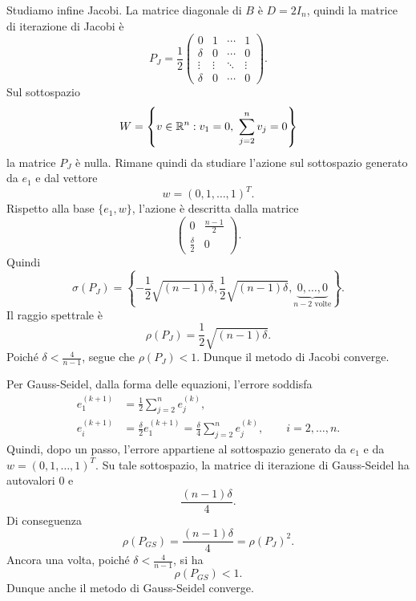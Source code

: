 \documentclass[a4paper]{article}
\begin{document}
\begin{snippetsolution}{}
    Studiamo infine Jacobi. La matrice diagonale di \(B\) è \(D=2I_n\), quindi la
    matrice di iterazione di Jacobi è
    \[
        P_J=
        \frac{1}{2}
        \begin{pmatrix}
            0 & 1 & \cdots & 1 \\
            \delta & 0 & \cdots & 0 \\
            \vdots & \vdots & \ddots & \vdots \\
            \delta & 0 & \cdots & 0
        \end{pmatrix}.
    \]
    Sul sottospazio
    \[
        W=
        \left\{
            v\in\mathbb{R}^n:
            v_1=0,\
            \sum_{j=2}^{n}v_j=0
        \right\}
    \]
    la matrice \(P_J\) è nulla. Rimane quindi da studiare l'azione sul sottospazio
    generato da \(e_1\) e dal vettore
    \[
        w=(0,1,\ldots,1)^T.
    \]
    Rispetto alla base \(\{e_1,w\}\), l'azione è descritta dalla matrice
    \[
        \begin{pmatrix}
            0 & \frac{n-1}{2} \\
            \frac{\delta}{2} & 0
        \end{pmatrix}.
    \]
    Quindi
    \[
        \sigma(P_J)=
        \left\{
            -\frac{1}{2}\sqrt{(n-1)\delta},
            \frac{1}{2}\sqrt{(n-1)\delta},
            \underbrace{0,\ldots,0}_{n-2\text{ volte}}
        \right\}.
    \]
    Il raggio spettrale è
    \[
        \rho(P_J)
        =
        \frac{1}{2}\sqrt{(n-1)\delta}.
    \]
    Poiché \(\delta<\frac{4}{n-1}\), segue che \(\rho(P_J)<1\).
    Dunque il metodo di Jacobi converge.

    Per Gauss-Seidel, dalla forma delle equazioni, l'errore soddisfa
    \begin{align*}
        e_1^{(k+1)}
        &=
        \frac{1}{2}\sum_{j=2}^{n}e_j^{(k)}, \\
        e_i^{(k+1)}
        &=
        \frac{\delta}{2}e_1^{(k+1)}
        =
        \frac{\delta}{4}\sum_{j=2}^{n}e_j^{(k)},
        \qquad i=2,\ldots,n.
    \end{align*}
    Quindi, dopo un passo, l'errore appartiene al sottospazio generato da \(e_1\)
    e da \(w=(0,1,\ldots,1)^T\). Su tale sottospazio, la matrice di iterazione
    di Gauss-Seidel ha autovalori \(0\) e
    \[
        \frac{(n-1)\delta}{4}.
    \]
    Di conseguenza
    \[
        \rho(P_{GS})
        =
        \frac{(n-1)\delta}{4}
        =
        \rho(P_J)^2.
    \]
    Ancora una volta, poiché \(\delta<\frac{4}{n-1}\), si ha
    \[
        \rho(P_{GS})<1.
    \]
    Dunque anche il metodo di Gauss-Seidel converge.
\end{snippetsolution}
\end{document}
